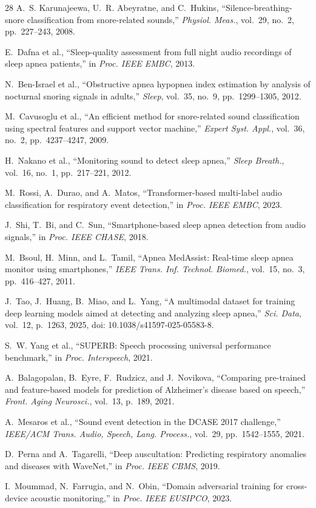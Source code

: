 \documentclass[conference]{IEEEtran}
\begin{document}
\begin{thebibliography}{28}
A.~S. Karunajeewa, U.~R. Abeyratne, and C.~Hukins, ``Silence-breathing-snore
classification from snore-related sounds,'' \emph{Physiol. Meas.}, vol.~29,
no.~2, pp.~227--243, 2008.

E.~Dafna et al., ``Sleep-quality assessment from full night audio recordings
of sleep apnea patients,'' in \emph{Proc. IEEE EMBC}, 2013.

N.~Ben-Israel et al., ``Obstructive apnea hypopnea index estimation by
analysis of nocturnal snoring signals in adults,'' \emph{Sleep}, vol.~35,
no.~9, pp.~1299--1305, 2012.



M.~Cavusoglu et al., ``An efficient method for snore-related sound
classification using spectral features and support vector machine,''
\emph{Expert Syst. Appl.}, vol.~36, no.~2, pp.~4237--4247, 2009.

H.~Nakano et al., ``Monitoring sound to detect sleep apnea,'' \emph{Sleep
Breath.}, vol.~16, no.~1, pp.~217--221, 2012.

M.~Rossi, A.~Durao, and A.~Matos, ``Transformer-based multi-label audio
classification for respiratory event detection,'' in \emph{Proc. IEEE EMBC},
2023.

J.~Shi, T.~Bi, and C.~Sun, ``Smartphone-based sleep apnea detection from
audio signals,'' in \emph{Proc. IEEE CHASE}, 2018.

M.~Bsoul, H.~Minn, and L.~Tamil, ``Apnea MedAssist: Real-time sleep apnea
monitor using smartphones,'' \emph{IEEE Trans. Inf. Technol. Biomed.},
vol.~15, no.~3, pp.~416--427, 2011.

J.~Tao, J.~Huang, B.~Miao, and L.~Yang, ``A multimodal dataset for training deep learning models aimed at detecting and analyzing sleep apnea,'' \emph{Sci. Data}, vol.~12, p.~1263, 2025, doi: 10.1038/s41597-025-05583-8.

S.~W. Yang et al., ``SUPERB: Speech processing universal performance
benchmark,'' in \emph{Proc. Interspeech}, 2021.

A.~Balagopalan, B.~Eyre, F.~Rudzicz, and J.~Novikova, ``Comparing
pre-trained and feature-based models for prediction of Alzheimer's disease
based on speech,'' \emph{Front. Aging Neurosci.}, vol.~13, p.~189, 2021.

A.~Mesaros et al., ``Sound event detection in the DCASE 2017 challenge,''
\emph{IEEE/ACM Trans. Audio, Speech, Lang. Process.}, vol.~29,
pp.~1542--1555, 2021.

D.~Perna and A.~Tagarelli, ``Deep auscultation: Predicting respiratory
anomalies and diseases with WaveNet,'' in \emph{Proc. IEEE CBMS}, 2019.

I.~Moummad, N.~Farrugia, and N.~Obin, ``Domain adversarial training for
cross-device acoustic monitoring,'' in \emph{Proc. IEEE EUSIPCO}, 2023.


\end{thebibliography}
\end{document}
